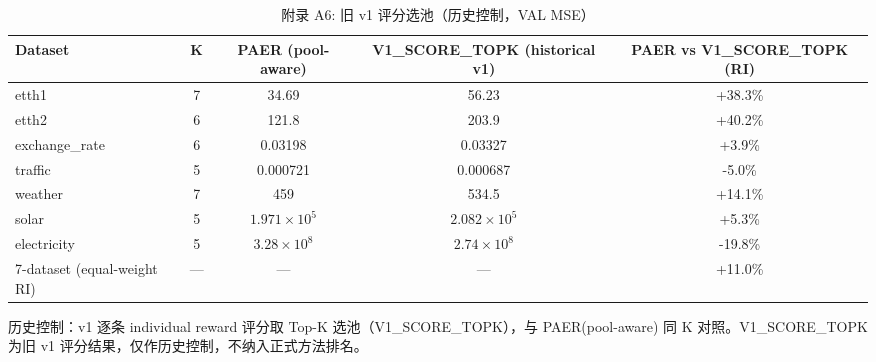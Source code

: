 \begin{table}[htbp]
  \centering
  \caption{附录 A6: 旧 v1 评分选池（历史控制，VAL MSE）}
  \label{tab:appendix_v1score}
  \begin{tabular}{lcccc}
    \toprule
    Dataset & K & PAER (pool-aware) & V1\_SCORE\_TOPK (historical v1) & PAER vs V1\_SCORE\_TOPK (RI) \\
    \midrule
    etth1 & 7 & 34.69 & 56.23 & +38.3\% \\
    etth2 & 6 & 121.8 & 203.9 & +40.2\% \\
    exchange\_rate & 6 & 0.03198 & 0.03327 & +3.9\% \\
    traffic & 5 & 0.000721 & 0.000687 & -5.0\% \\
    weather & 7 & 459 & 534.5 & +14.1\% \\
    solar & 5 & $1.971\times10^{5}$ & $2.082\times10^{5}$ & +5.3\% \\
    electricity & 5 & $3.28\times10^{8}$ & $2.74\times10^{8}$ & -19.8\% \\
    7-dataset (equal-weight RI) & — & — & — & +11.0\% \\
    \bottomrule
  \end{tabular}
  {\footnotesize 历史控制：v1 逐条 individual reward 评分取 Top-K 选池（V1\_SCORE\_TOPK），与 PAER(pool-aware) 同 K 对照。V1\_SCORE\_TOPK 为旧 v1 评分结果，仅作历史控制，不纳入正式方法排名。}
\end{table}
